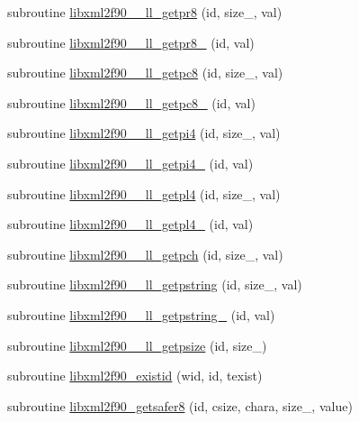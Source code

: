 \begin{DoxyCompactItemize}
\item 
subroutine \hyperlink{libxml2f90_8f90__pp_8f90_a5ffa8a56b1901a92be64556fe9f30e07}{libxml2f90\+\_\+\+\_\+ll\+\_\+getpr8} (id, size\+\_\+, val)
\item 
subroutine \hyperlink{libxml2f90_8f90__pp_8f90_a2a94c2cace24434f63c63fb2b59ed196}{libxml2f90\+\_\+\+\_\+ll\+\_\+getpr8\+\_\+} (id, val)
\item 
subroutine \hyperlink{libxml2f90_8f90__pp_8f90_ac08cc5083f67fe974663dee0dd7066d5}{libxml2f90\+\_\+\+\_\+ll\+\_\+getpc8} (id, size\+\_\+, val)
\item 
subroutine \hyperlink{libxml2f90_8f90__pp_8f90_adf6af0ff041c73c9d338df8a99c88137}{libxml2f90\+\_\+\+\_\+ll\+\_\+getpc8\+\_\+} (id, val)
\item 
subroutine \hyperlink{libxml2f90_8f90__pp_8f90_a02ca594441825f41fac314030efac043}{libxml2f90\+\_\+\+\_\+ll\+\_\+getpi4} (id, size\+\_\+, val)
\item 
subroutine \hyperlink{libxml2f90_8f90__pp_8f90_a3c828932bda4b9d96cb11bac75a064f2}{libxml2f90\+\_\+\+\_\+ll\+\_\+getpi4\+\_\+} (id, val)
\item 
subroutine \hyperlink{libxml2f90_8f90__pp_8f90_aae0db9dc81cd11d2c8f85d42f01321e5}{libxml2f90\+\_\+\+\_\+ll\+\_\+getpl4} (id, size\+\_\+, val)
\item 
subroutine \hyperlink{libxml2f90_8f90__pp_8f90_ac77032833d26c0b15ec204a9b8bd5888}{libxml2f90\+\_\+\+\_\+ll\+\_\+getpl4\+\_\+} (id, val)
\item 
subroutine \hyperlink{libxml2f90_8f90__pp_8f90_aa79b29b7afab3cf465e4d7b328007346}{libxml2f90\+\_\+\+\_\+ll\+\_\+getpch} (id, size\+\_\+, val)
\item 
subroutine \hyperlink{libxml2f90_8f90__pp_8f90_a956943680a07e3d0179b205f6209d9cb}{libxml2f90\+\_\+\+\_\+ll\+\_\+getpstring} (id, size\+\_\+, val)
\item 
subroutine \hyperlink{libxml2f90_8f90__pp_8f90_ae6434bdc3ab4de456efd90e496483891}{libxml2f90\+\_\+\+\_\+ll\+\_\+getpstring\+\_\+} (id, val)
\item 
subroutine \hyperlink{libxml2f90_8f90__pp_8f90_ab594e6f189158ab0e2fc4db0d03392ad}{libxml2f90\+\_\+\+\_\+ll\+\_\+getpsize} (id, size\+\_\+)
\item 
subroutine \hyperlink{libxml2f90_8f90__pp_8f90_aedaeb0ba8d5ce41c39baed261d3f82c5}{libxml2f90\+\_\+existid} (wid, id, texist)
\item 
subroutine \hyperlink{libxml2f90_8f90__pp_8f90_a7851da50fe7a6768aa6f0d04aa9345a0}{libxml2f90\+\_\+getsafer8} (id, csize, chara, size\+\_\+, value)

\end{DoxyCompactItemize}
